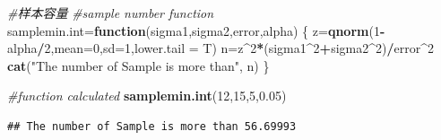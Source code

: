 \documentclass[]{article}
\newenvironment{Shaded}{\begin{snugshade}}{\end{snugshade}}
\newcommand{\KeywordTok}[1]{\textcolor[rgb]{0.13,0.29,0.53}{\textbf{#1}}}
\newcommand{\DataTypeTok}[1]{\textcolor[rgb]{0.13,0.29,0.53}{#1}}
\newcommand{\DecValTok}[1]{\textcolor[rgb]{0.00,0.00,0.81}{#1}}
\newcommand{\FloatTok}[1]{\textcolor[rgb]{0.00,0.00,0.81}{#1}}
\newcommand{\StringTok}[1]{\textcolor[rgb]{0.31,0.60,0.02}{#1}}
\newcommand{\CommentTok}[1]{\textcolor[rgb]{0.56,0.35,0.01}{\textit{#1}}}
\newcommand{\ControlFlowTok}[1]{\textcolor[rgb]{0.13,0.29,0.53}{\textbf{#1}}}
\newcommand{\OperatorTok}[1]{\textcolor[rgb]{0.81,0.36,0.00}{\textbf{#1}}}
\newcommand{\NormalTok}[1]{#1}
\begin{document}
\begin{Shaded}
\begin{Highlighting}[]
\CommentTok{#样本容量}
\CommentTok{#sample number function}
\NormalTok{samplemin.int=}\ControlFlowTok{function}\NormalTok{(sigma1,sigma2,error,alpha) \{}
\NormalTok{  z=}\KeywordTok{qnorm}\NormalTok{(}\DecValTok{1}\OperatorTok{-}\NormalTok{alpha}\OperatorTok{/}\DecValTok{2}\NormalTok{,}\DataTypeTok{mean=}\DecValTok{0}\NormalTok{,}\DataTypeTok{sd=}\DecValTok{1}\NormalTok{,}\DataTypeTok{lower.tail =}\NormalTok{ T)}
\NormalTok{  n=z}\OperatorTok{^}\DecValTok{2}\OperatorTok{*}\NormalTok{(sigma1}\OperatorTok{^}\DecValTok{2}\OperatorTok{+}\NormalTok{sigma2}\OperatorTok{^}\DecValTok{2}\NormalTok{)}\OperatorTok{/}\NormalTok{error}\OperatorTok{^}\DecValTok{2}
  \KeywordTok{cat}\NormalTok{(}\StringTok{"The number of Sample is more than"}\NormalTok{, n)}
\NormalTok{\}}

\CommentTok{#function calculated}
\KeywordTok{samplemin.int}\NormalTok{(}\DecValTok{12}\NormalTok{,}\DecValTok{15}\NormalTok{,}\DecValTok{5}\NormalTok{,}\FloatTok{0.05}\NormalTok{)}
\end{Highlighting}
\end{Shaded}

\begin{verbatim}
## The number of Sample is more than 56.69993
\end{verbatim}
\end{document}
